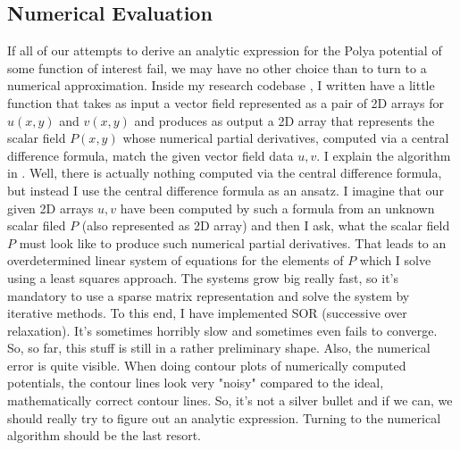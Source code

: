 \documentclass[12pt]{article}
\begin{document}

\subsection{Numerical Evaluation}
If all of our attempts to derive an analytic expression for the Polya potential of some function of interest fail, we may have no other choice than to turn to a numerical approximation. Inside my research codebase \cite{GitHub}, I written have a little function that takes as input a vector field represented as a pair of 2D arrays for $u(x,y)$ and $v(x,y)$ and produces as output a 2D array that represents the scalar field $P(x,y)$ whose numerical partial derivatives, computed via a central difference formula, match the given vector field data $u,v$. I explain the algorithm in \cite{PotentialNumerical}. Well, there is actually nothing computed via the central difference formula, but instead I use the central difference formula as an ansatz. I imagine that our given 2D arrays  $u,v$ have been computed by such a formula from an unknown scalar filed $P$ (also represented as 2D array) and then I ask, what the scalar field $P$ must look like to produce such numerical partial derivatives. That leads to an overdetermined linear system of equations for the elements of $P$ which I solve using a least squares approach. The systems grow big really fast, so it's mandatory to use a sparse matrix representation and solve the system by iterative methods. To this end, I have implemented SOR (successive over relaxation). It's sometimes horribly slow and sometimes even fails to converge. So, so far, this stuff is still in a rather preliminary shape. Also, the numerical error is quite visible. When doing contour plots of numerically computed potentials, the contour lines look very "noisy" compared to the ideal, mathematically correct contour lines. So, it's not a silver bullet and if we can, we should really try to figure out an analytic expression. Turning to the numerical algorithm should be the last resort.
\end{document}
